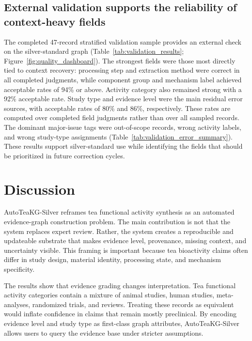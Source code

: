 \documentclass[11pt]{article}
\begin{document}
\subsection{External validation supports the reliability of context-heavy fields}

The completed 47-record stratified validation sample provides an external check on the silver-standard graph (Table~\ref{tab:validation_results}; Figure~\ref{fig:quality_dashboard}). The strongest fields were those most directly tied to context recovery: processing step and extraction method were correct in all completed judgments, while component group and mechanism label achieved acceptable rates of 94\% or above. Activity category also remained strong with a 92\% acceptable rate. Study type and evidence level were the main residual error sources, with acceptable rates of 80\% and 86\%, respectively. These rates are computed over completed field judgments rather than over all sampled records. The dominant major-issue tags were out-of-scope records, wrong activity labels, and wrong study-type assignments (Table~\ref{tab:validation_error_summary}). These results support silver-standard use while identifying the fields that should be prioritized in future correction cycles.





\section{Discussion}

AutoTeaKG-Silver reframes tea functional activity synthesis as an automated evidence-graph construction problem. The main contribution is not that the system replaces expert review. Rather, the system creates a reproducible and updateable substrate that makes evidence level, provenance, missing context, and uncertainty visible. This framing is important because tea bioactivity claims often differ in study design, material identity, processing state, and mechanism specificity.

The results show that evidence grading changes interpretation. Tea functional activity categories contain a mixture of animal studies, human studies, meta-analyses, randomized trials, and reviews. Treating these records as equivalent would inflate confidence in claims that remain mostly preclinical. By encoding evidence level and study type as first-class graph attributes, AutoTeaKG-Silver allows users to query the evidence base under stricter assumptions.
\end{document}
